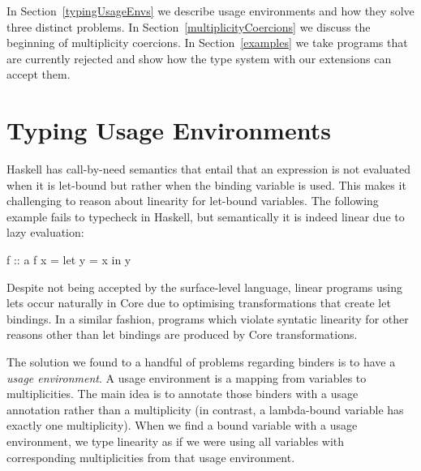 \documentclass[]{lwnovathesis}
\begin{document}
In Section~\ref{typingUsageEnvs} we describe usage environments and how they
solve three distinct problems. In Section~\ref{multiplicityCoercions} we discuss
the beginning of multiplicity coercions. In Section~\ref{examples} we take
programs that are currently rejected and show how the type system with our
extensions can accept them.




\section{Typing Usage Environments\label{typingUsageEnvs}}

Haskell has call-by-need semantics that entail that an expression is not
evaluated when it is let-bound but rather when the binding variable is used.
This makes it challenging to reason about linearity for let-bound variables. The
following example fails to typecheck in Haskell, but semantically it is indeed
linear due to lazy evaluation:

\begin{code}
f :: a %
f x = let y = x in y
\end{code}

Despite not being accepted by the surface-level language, linear programs using
lets occur naturally in Core due to optimising transformations that create let
bindings. In a similar fashion, programs which violate syntatic linearity
for other reasons other than let bindings are produced by Core transformations.

The solution we found to a handful of problems regarding binders is to have a
\emph{usage environment}. A usage environment is a mapping from variables to
multiplicities. The main idea is to annotate those binders with a usage
annotation rather than a multiplicity (in contrast, a lambda-bound variable has
exactly one multiplicity). When we find a bound variable with a usage
environment, we type linearity as if we were using all variables with
corresponding multiplicities from that usage environment.
\end{document}
